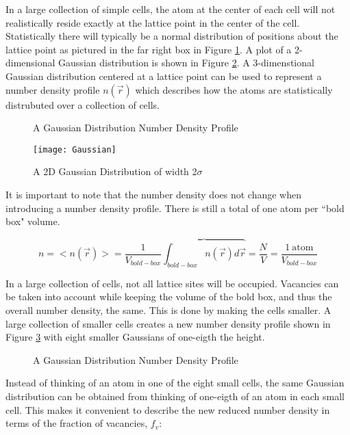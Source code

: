 \documentclass[12pt]{article}
\begin{document}
In a large collection of simple cells, the atom at the center of each cell will not realistically reside exactly at the lattice point in the center of the cell. Statistically there will typically be a normal distribution of positions about the lattice point as pictured in the far right box in Figure \ref{fig:Ensemble_Gaus}. A plot of a 2-dimensional Gaussian distribution is shown in Figure \ref{fig:Gaus_plot}. A 3-dimenstional Gaussian distribution centered at a lattice point can be used to represent a number density profile $n(\vec{r})$  which describes how the atoms are statistically distrubuted over a collection of cells.

  \begin{figure}[h!]
    \centering
    \caption{A Gaussian Distribution Number Density Profile}
    \label{fig:Ensemble_Gaus}
  \end{figure} 


 \begin{figure}[h!]
    \centering
    \texttt{[image: Gaussian]}
    \caption{A 2D Gaussian Distribution of width 2$\sigma$}
    \label{fig:Gaus_plot}
  \end{figure}  

It is important to note that the number density does not change when introducing a number density profile. There is still a total of one atom per ``bold box" volume.

\begin{equation}{n=<n(\vec{r})>=\frac{1}{V_{bold-box}}\overbrace{\int_{bold-box}{n(\vec{r})}{d\vec{r}}}=\frac{N}{V}=\frac{1~\text{atom}}{V_{bold-box}}}\end{equation}

In a large collection of cells, not all lattice sites will be occupied. Vacancies can be taken into account while keeping the volume of the bold box, and thus the overall number density, the same. This is done by making the cells smaller. A large collection of smaller cells creates a new number density profile shown in Figure \ref{fig:Ensemble_Smallcells} with eight smaller Gaussians of one-eigth the height.

 \begin{figure}[h!]
    \centering
    \caption{A Gaussian Distribution Number Density Profile}
    \label{fig:Ensemble_Smallcells}
  \end{figure} 

Instead of thinking of an atom in one of the eight small cells, the same Gaussian distribution can be obtained from thinking of one-eigth of an atom in each small cell. This makes it convenient to describe the new reduced number density in terms of the fraction of vacancies, $f_v$: 
\end{document}
